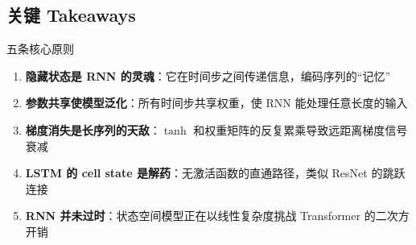 \documentclass[a4paper]{article}
\begin{document}
\subsection{关键 Takeaways}

\begin{importantbox}{五条核心原则}
\begin{enumerate}
    \item \textbf{隐藏状态是 RNN 的灵魂}：它在时间步之间传递信息，编码序列的``记忆''
    \item \textbf{参数共享使模型泛化}：所有时间步共享权重，使 RNN 能处理任意长度的输入
    \item \textbf{梯度消失是长序列的天敌}：$\tanh$ 和权重矩阵的反复累乘导致远距离梯度信号衰减
    \item \textbf{LSTM 的 cell state 是解药}：无激活函数的直通路径，类似 ResNet 的跳跃连接
    \item \textbf{RNN 并未过时}：状态空间模型正在以线性复杂度挑战 Transformer 的二次方开销
\end{enumerate}
\end{importantbox}
\end{document}
